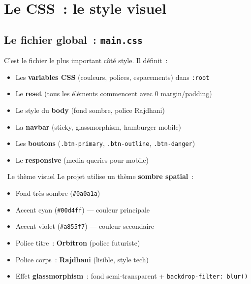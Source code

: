 \documentclass[12pt,a4paper]{article}
\begin{document}
\section{Le CSS~: le style visuel}

\subsection{Le fichier global~: \texttt{main.css}}

C'est le fichier le plus important côté style. Il définit~:

\begin{itemize}
    \item Les \textbf{variables CSS} (couleurs, polices, espacements) dans \texttt{:root}
    \item Le \textbf{reset} (tous les éléments commencent avec 0 margin/padding)
    \item Le style du \textbf{body} (fond sombre, police Rajdhani)
    \item La \textbf{navbar} (sticky, glassmorphism, hamburger mobile)
    \item Les \textbf{boutons} (\texttt{.btn-primary}, \texttt{.btn-outline}, \texttt{.btn-danger})
    \item Le \textbf{responsive} (media queries pour mobile)
\end{itemize}

\begin{conceptbox}{\faPalette\ Le thème visuel}
Le projet utilise un thème \textbf{sombre spatial}~:
\begin{itemize}
    \item Fond très sombre (\texttt{\#0a0a1a})
    \item Accent cyan (\texttt{\#00d4ff}) --- couleur principale
    \item Accent violet (\texttt{\#a855f7}) --- couleur secondaire
    \item Police titre~: \textbf{Orbitron} (police futuriste)
    \item Police corps~: \textbf{Rajdhani} (lisible, style tech)
    \item Effet \textbf{glassmorphism}~: fond semi-transparent + \texttt{backdrop-filter: blur()}
\end{itemize}
\end{conceptbox}
\end{document}
